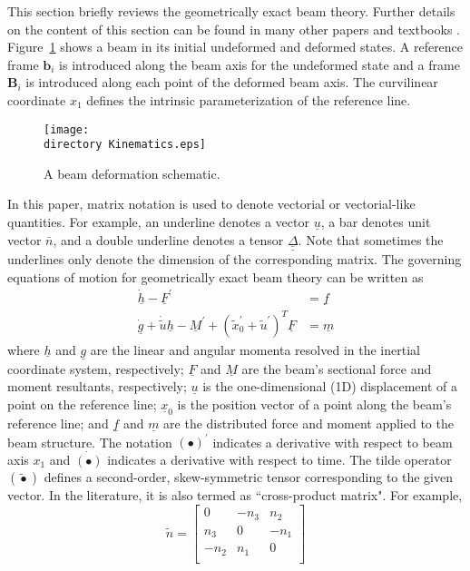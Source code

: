 \documentclass{aiaa-tc}
\def\directory{EPSF/}
\renewcommand{\vec}[1]{\underline{#1}}
\renewcommand{\skew}[1]{\widetilde{#1}}
\begin{document}
This section briefly reviews the geometrically exact beam theory. Further details on the content of this section can be found in many other papers and textbooks \cite{HodgesBeamBook,Bauchau:2010,YuGEBT}.
Figure~\ref{Kinematics} shows a beam in its initial undeformed
and deformed states. A reference frame $\mathbf{b}_i$ is introduced along the
beam axis for the undeformed state and a frame $\mathbf{B}_i$ is introduced
along each point of the deformed beam axis. The curvilinear coordinate $x_1$ defines the intrinsic parameterization of the reference line.
\begin{figure}
\centering
\texttt{[image: \\directory Kinematics.eps]}
\caption{A beam deformation schematic.} \label{Kinematics}
\end{figure}
In this paper, matrix notation is used to denote vectorial or vectorial-like quantities. For example, an underline denotes a vector $\underline{u}$, a bar denotes unit vector $\bar{n}$, and a double underline denotes a tensor $\underline{\underline{\Delta}}$. Note that sometimes the underlines only denote the dimension of the corresponding matrix. The governing equations of motion for geometrically exact beam theory can be written as \cite{Bauchau:2010}
\begin{align}
	\label{GovernGEBT-1}
	\dot{\underline{h}} - \underline{F}^\prime &= \underline{f} \\
	\label{GovernGEBT-2}
	\dot{\underline{g}} + \dot{\tilde{u}} \underline{h} - \underline{M}^\prime + (\tilde{x}_0^\prime + \tilde{u}^\prime)^T \underline{F} &= \underline{m}
\end{align}
where $\vec{h}$ and $\vec{g}$ are the linear and angular momenta resolved in the inertial coordinate system, respectively; $\vec{F}$ and $\vec{M}$ are the beam's sectional force and moment resultants, respectively; $\vec{u}$ is the one-dimensional (1D) displacement of a point on the reference line; $\vec{x}_0$ is the position vector of a point along the beam's reference line;  and $\vec{f}$ and $\vec{m}$ are the distributed force and moment applied to the beam structure.  The notation $(\bullet)^\prime$ indicates a derivative with respect to beam axis $x_1$ and $\dot{(\bullet)}$ indicates a derivative with respect to time. The tilde operator $(\skew{\bullet})$ defines a second-order, skew-symmetric tensor corresponding to the given vector. In the literature, it is also termed as ``cross-product matrix". For example,
\[
	\skew{n} = 
	     		\begin{bmatrix}
			0 & -n_3 & n_2 \\
			n_3 & 0 & -n_1 \\
			-n_2 & n_1 & 0\\
			\end{bmatrix}	
\]
\end{document}
